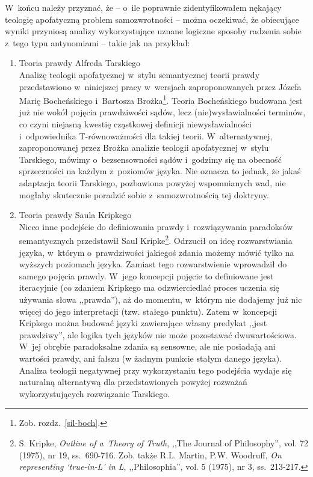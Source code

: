 W~końcu należy przyznać, że -- o~ile poprawnie zidentyfikowałem nękający teologię apofatyczną problem samozwrotności -- można oczekiwać, że obiecujące wyniki przyniosą analizy wykorzystujące uznane logiczne sposoby radzenia sobie z~tego typu antynomiami -- takie jak na przykład:
\begin{enumerate}[label = \arabic*), itemindent=6mm, labelwidth=4mm, labelsep=2mm, itemsep=1em, leftmargin=0mm]
\item Teoria prawdy Alfreda Tarskiego\\
Analizę teologii apofatycznej w~stylu semantycznej teorii prawdy przedstawiono w~niniejszej pracy w~wersjach zaproponowanych przez Józefa Marię Bocheńskiego i~Bartosza Brożka\footnote{Zob. rozdz.~\ref{sil-boch}.}. Teoria Bocheńskiego budowana jest już nie wokół pojęcia prawdziwości sądów, lecz (nie)wysławialności terminów, co czyni niejasną kwestię cząstkowej definicji niewysławialności i~odpowiednika T-równoważności dla takiej teorii. W~alternatywnej, zaproponowanej przez Brożka analizie teologii apofatycznej w~stylu Tarskiego, mówimy o~bezsensowności sądów i~godzimy się na obecność sprzeczności na każdym z~poziomów języka. Nie oznacza to jednak, że jakaś adaptacja teorii Tarskiego, pozbawiona powyżej wspomnianych wad, nie mogłaby skutecznie poradzić sobie z~samozwrotnością tej doktryny.

\item Teoria prawdy Saula Kripkego\\
Nieco inne podejście do definiowania prawdy i~rozwiązywania paradoksów semantycznych przedstawił Saul Kripke\footnote{S. Kripke, \textit{Outline of a~Theory of Truth}, ,,The Journal of Philosophy'', vol. 72 (1975), nr 19, ss.~690-716. Zob. także R.L. Martin, P.W. Woodruff, \textit{On representing ‘true-in-L' in L}, ,,Philosophia'', vol. 5 (1975), nr 3, ss.~213-217.}. Odrzucił on ideę rozwarstwiania języka, w~którym o~prawdziwości jakiegoś zdania możemy mówić tylko na wyższych poziomach języka. Zamiast tego rozwarstwienie wprowadził do samego pojęcia prawdy. W~jego koncepcji pojęcie to definiowane jest iteracyjnie (co zdaniem Kripkego ma odzwierciedlać proces uczenia się używania słowa ,,prawda''), aż do momentu, w~którym nie dodajemy już nic więcej do jego interpretacji (tzw. stałego punktu). Zatem w~koncepcji Kripkego można budować języki zawierające własny predykat ,,jest prawdziwy'', ale logika tych języków nie może pozostawać dwuwartościowa. W~jej obrębie paradoksalne zdania są sensowne, ale nie posiadają ani wartości prawdy, ani fałszu (w żadnym punkcie stałym danego języka). Analiza teologii negatywnej przy wykorzystaniu tego podejścia wydaje się naturalną alternatywą dla przedstawionych powyżej rozważań wykorzystujących rozwiązanie Tarskiego.


\end{enumerate}
